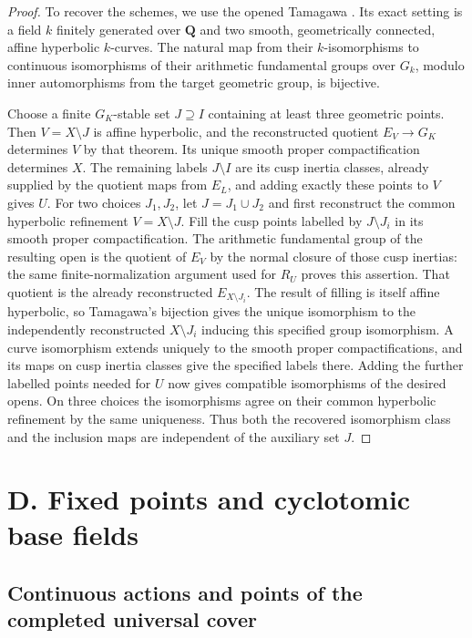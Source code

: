 \documentclass[11pt,a4paper]{article}
\begin{document}
\begin{proof}
To recover the schemes, we use the opened Tamagawa
\cite[Theorem (0.3), with Conjecture (0.1)(ii) as its stated formulation]
{B_Tamagawa1997}. Its exact setting is a field $k$ finitely generated over
$\mathbf Q$ and two smooth, geometrically connected, affine hyperbolic
$k$-curves. The natural map from their $k$-isomorphisms to continuous
isomorphisms of their arithmetic fundamental groups over $G_k$, modulo
inner automorphisms from the target geometric group, is bijective.

Choose a finite $G_K$-stable set $J\supseteq I$ containing at least three
geometric points. Then $V=X\setminus J$ is affine hyperbolic, and the
reconstructed quotient $E_V\to G_K$ determines $V$ by that theorem.
Its unique smooth proper compactification determines $X$. The remaining
labels $J\setminus I$ are its cusp inertia classes, already supplied by
the quotient maps from $E_L$, and adding exactly these points to $V$
gives $U$. For two choices $J_1,J_2$, let $J=J_1\cup J_2$ and first
reconstruct the common hyperbolic refinement $V=X\setminus J$.
Fill the cusp points labelled by $J\setminus J_i$ in its smooth proper
compactification. The arithmetic fundamental group of the resulting
open is the quotient of $E_V$ by the normal closure of those cusp
inertias: the same finite-normalization argument used for $R_U$ proves
this assertion. That quotient is the already reconstructed
$E_{X\setminus J_i}$. The result of filling is itself affine
hyperbolic, so Tamagawa's bijection gives the unique isomorphism to
the independently reconstructed $X\setminus J_i$ inducing this
specified group isomorphism. A curve isomorphism extends uniquely to
the smooth proper compactifications, and its maps on cusp inertia
classes give the specified labels there. Adding the further labelled
points needed for $U$ now gives compatible isomorphisms of the desired
opens. On three choices the isomorphisms agree on their common
hyperbolic refinement by the same uniqueness. Thus both the recovered
isomorphism class and the inclusion maps are independent of the
auxiliary set $J$.
\end{proof}


\section{D. Fixed points and cyclotomic base fields}

\subsection{Continuous actions and points of the completed universal cover}
\end{document}
